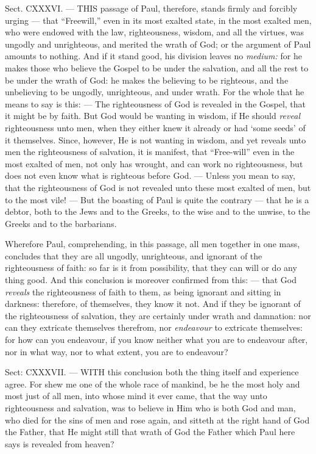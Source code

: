 
Sect. CXXXVI. — THIS passage of Paul, therefore, stands firmly and forcibly urging — that “Freewill,” even in its most exalted state, in the most exalted men, who were endowed with the law, righteousness, wisdom, and all the virtues, was ungodly and unrighteous, and merited the wrath of God; or the argument of Paul amounts to nothing. And if it stand good, his division leaves no \emph{medium: }for he makes those who believe the Gospel to be under the salvation, and all the rest to be under the wrath of God: he makes the believing to be righteous, and the unbelieving to be ungodly, unrighteous, and under wrath. For the whole that he means to say is this: — The righteousness of God is revealed in the Gospel, that it might be by faith. But God would be wanting in wisdom, if He should \emph{reveal }righteousness unto men, when they either knew it already or had ‘some seeds’ of it themselves. Since, however, He is not wanting in wisdom, and yet reveals unto men the righteousness of salvation, it is manifest, that “Free-will” even in the most exalted of men, not only has wrought, and can work no righteousness, but does not even know what is righteous before God. — Unless you mean to say, that the righteousness of God is not revealed unto these most exalted of men, but to the most vile! — But the boasting of Paul is quite the contrary — that he is a debtor, both to the Jews and to the Greeks, to the wise and to the unwise, to the Greeks and to the barbarians.

Wherefore Paul, comprehending, in this passage, all men together in one mass, concludes that they are all ungodly, unrighteous, and ignorant of the righteousness of faith: so far is it from possibility, that they can will or do any thing good. And this conclusion is moreover confirmed from this: — that God \emph{reveals }the righteousness of faith to them, as being ignorant and sitting in darkness: therefore, of themselves, they know it not. And if they be ignorant of the righteousness of salvation, they are certainly under wrath and damnation: nor can they extricate themselves therefrom, nor \emph{endeavour }to extricate themselves: for how can you endeavour, if you know neither what you are to endeavour after, nor in what way, nor to what extent, you are to endeavour?


Sect: CXXXVII. — WITH this conclusion both the thing itself and experience agree. For shew me one of the whole race of mankind, be he the most holy and most just of all men, into whose mind it ever came, that the way unto righteousness and salvation, was to believe in Him who is both God and man, who died for the sins of men and rose again, and sitteth at the right hand of God the Father, that He might still that wrath of God the Father which Paul here says is revealed from heaven?

